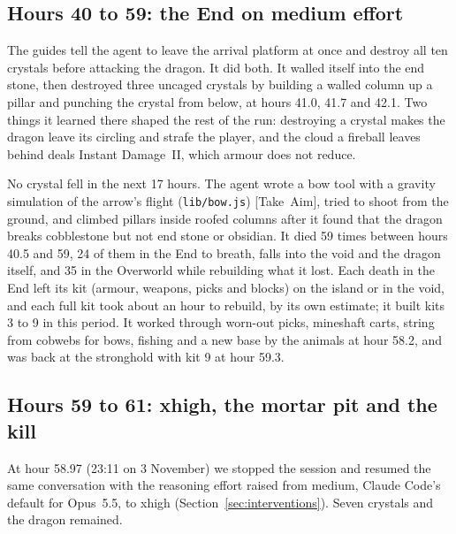 \documentclass[11pt,a4paper]{article}
\newcommand{\adv}[1]{\mbox{\textsf{[#1]}}}
\begin{document}
\subsection{Hours 40 to 59: the End on medium effort}

The guides tell the agent to leave the arrival platform at once and destroy all ten crystals before attacking the dragon. It did both. It walled itself into the end stone, then destroyed three uncaged crystals by building a walled column up a pillar and punching the crystal from below, at hours 41.0, 41.7 and 42.1. Two things it learned there shaped the rest of the run: destroying a crystal makes the dragon leave its circling and strafe the player, and the cloud a fireball leaves behind deals Instant Damage~II, which armour does not reduce.

No crystal fell in the next 17 hours. The agent wrote a bow tool with a gravity simulation of the arrow's flight (\texttt{lib/bow.js}) \adv{Take Aim}, tried to shoot from the ground, and climbed pillars inside roofed columns after it found that the dragon breaks cobblestone but not end stone or obsidian. It died 59 times between hours 40.5 and 59, 24 of them in the End to breath, falls into the void and the dragon itself, and 35 in the Overworld while rebuilding what it lost. Each death in the End left its kit (armour, weapons, picks and blocks) on the island or in the void, and each full kit took about an hour to rebuild, by its own estimate; it built kits 3 to 9 in this period. It worked through worn-out picks, mineshaft carts, string from cobwebs for bows, fishing and a new base by the animals at hour 58.2, and was back at the stronghold with kit 9 at hour 59.3.

\subsection{Hours 59 to 61: xhigh, the mortar pit and the kill}

At hour 58.97 (23:11 on 3 November) we stopped the session and resumed the same conversation with the reasoning effort raised from medium, Claude Code's default for Opus~5.5, to xhigh (Section~\ref{sec:interventions}). Seven crystals and the dragon remained.
\end{document}
